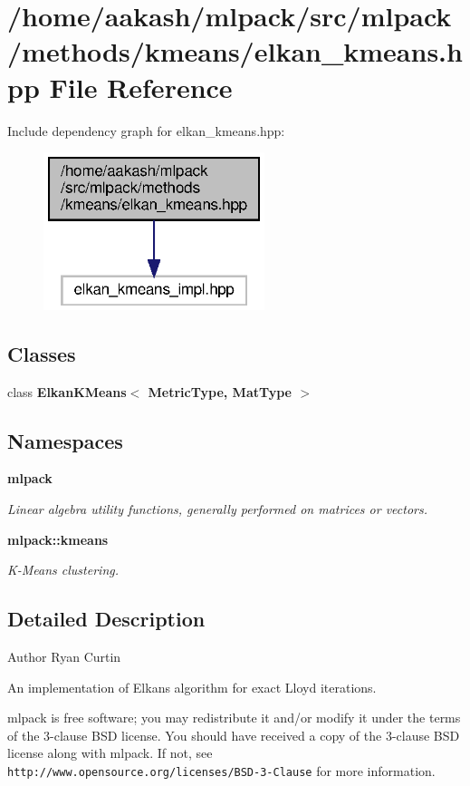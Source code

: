 \section{/home/aakash/mlpack/src/mlpack/methods/kmeans/elkan\+\_\+kmeans.hpp File Reference}
\label{elkan__kmeans_8hpp}
Include dependency graph for elkan\+\_\+kmeans.\+hpp\+:
\nopagebreak
\begin{figure}[H]
\begin{center}
\leavevmode
\includegraphics[width=183pt]{elkan__kmeans_8hpp__incl}
\end{center}
\end{figure}
\subsection*{Classes}
\begin{DoxyCompactItemize}
\item 
class \textbf{ Elkan\+K\+Means$<$ Metric\+Type, Mat\+Type $>$}
\end{DoxyCompactItemize}
\subsection*{Namespaces}
\begin{DoxyCompactItemize}
\item 
 \textbf{ mlpack}
\begin{DoxyCompactList}\small\item\em Linear algebra utility functions, generally performed on matrices or vectors. \end{DoxyCompactList}\item 
 \textbf{ mlpack\+::kmeans}
\begin{DoxyCompactList}\small\item\em K-\/\+Means clustering. \end{DoxyCompactList}\end{DoxyCompactItemize}


\subsection{Detailed Description}
\begin{DoxyAuthor}{Author}
Ryan Curtin
\end{DoxyAuthor}
An implementation of Elkan\textquotesingle{}s algorithm for exact Lloyd iterations.

mlpack is free software; you may redistribute it and/or modify it under the terms of the 3-\/clause B\+SD license. You should have received a copy of the 3-\/clause B\+SD license along with mlpack. If not, see {\tt http\+://www.\+opensource.\+org/licenses/\+B\+S\+D-\/3-\/\+Clause} for more information. 
